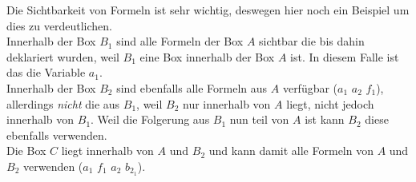 Die Sichtbarkeit von Formeln ist sehr wichtig, deswegen hier noch ein Beispiel um dies zu verdeutlichen.\\
Innerhalb der Box $B_1$ sind alle Formeln der Box $A$ sichtbar die bis dahin deklariert wurden, weil $B_1$ eine Box innerhalb der Box $A$ ist. In diesem Falle ist das die Variable $a_1$.\\
Innerhalb der Box $B_2$ sind ebenfalls alle Formeln aus $A$ verfügbar ($a_1$ $a_2$ $f_1$), allerdings \emph{nicht} die aus $B_1$, weil $B_2$ nur innerhalb von $A$ liegt, nicht jedoch innerhalb von $B_1$.
Weil die Folgerung aus $B_1$ nun teil von $A$ ist kann $B_2$ diese ebenfalls verwenden.\\
Die Box $C$ liegt innerhalb von $A$ und $B_2$ und kann damit alle Formeln von $A$ und $B_2$ verwenden ($a_1$ $f_1$ $a_2$ $b_{2_1}$).

\\




\paragraph{\ND \ML} %
\label{par:natuerliche_deduktion_ml}


